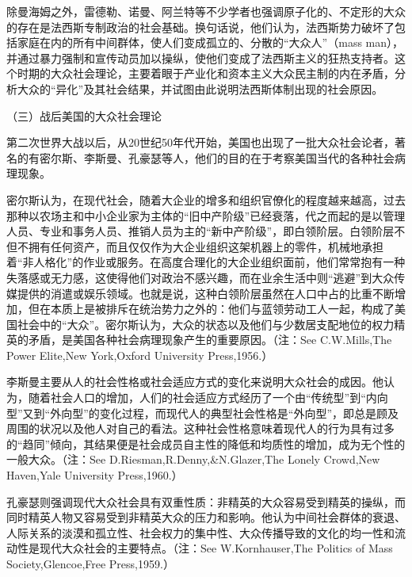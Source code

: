 \documentclass[UTF8,12pt]{ctexart}
\numberwithin{equation}{section} %
\numberwithin{figure}{section}
\numberwithin{table}{section}
\begin{document}
	除曼海姆之外，雷德勒、诺曼、阿兰特等不少学者也强调原子化的、不定形的大众的存在是法西斯专制政治的社会基础。换句话说，他们认为，法西斯势力破坏了包括家庭在内的所有中间群体，使人们变成孤立的、分散的“大众人”（mass man），并通过暴力强制和宣传动员加以操纵，使他们变成了法西斯主义的狂热支持者。这个时期的大众社会理论，主要着眼于产业化和资本主义大众民主制的内在矛盾，分析大众的“异化”及其社会结果，并试图由此说明法西斯体制出现的社会原因。
	
	（三）战后美国的大众社会理论
	
	第二次世界大战以后，从20世纪50年代开始，美国也出现了一批大众社会论者，著名的有密尔斯、李斯曼、孔豪瑟等人，他们的目的在于考察美国当代的各种社会病理现象。
	
	密尔斯认为，在现代社会，随着大企业的增多和组织官僚化的程度越来越高，过去那种以农场主和中小企业家为主体的“旧中产阶级”已经衰落，代之而起的是以管理人员、专业和事务人员、推销人员为主的“新中产阶级”，即白领阶层。白领阶层不但不拥有任何资产，而且仅仅作为大企业组织这架机器上的零件，机械地承担着“非人格化”的作业或服务。在高度合理化的大企业组织面前，他们常常抱有一种失落感或无力感，这使得他们对政治不感兴趣，而在业余生活中则“逃避”到大众传媒提供的消遣或娱乐领域。也就是说，这种白领阶层虽然在人口中占的比重不断增加，但在本质上是被排斥在统治势力之外的：他们与蓝领劳动工人一起，构成了美国社会中的“大众”。密尔斯认为，大众的状态以及他们与少数居支配地位的权力精英的矛盾，是美国各种社会病理现象产生的重要原因。（注：See C.W.Mills,The Power Elite,New York,Oxford University Press,1956.）
	
	李斯曼主要从人的社会性格或社会适应方式的变化来说明大众社会的成因。他认为，随着社会人口的增加，人们的社会适应方式经历了一个由“传统型”到“内向型”又到“外向型”的变化过程，而现代人的典型社会性格是“外向型”，即总是顾及周围的状况以及他人对自己的看法。这种社会性格意味着现代人的行为具有过多的“趋同”倾向，其结果便是社会成员自主性的降低和均质性的增加，成为无个性的一般大众。（注：See D.Riesman,R.Denny,\&N.Glazer,The Lonely Crowd,New Haven,Yale University Press,1960.）
	
	孔豪瑟则强调现代大众社会具有双重性质：非精英的大众容易受到精英的操纵，而同时精英人物又容易受到非精英大众的压力和影响。他认为中间社会群体的衰退、人际关系的淡漠和孤立性、社会权力的集中性、大众传播导致的文化的均一性和流动性是现代大众社会的主要特点。（注：See W.Kornhauser,The Politics of Mass Society,Glencoe,Free Press,1959.）
	
\end{document}
